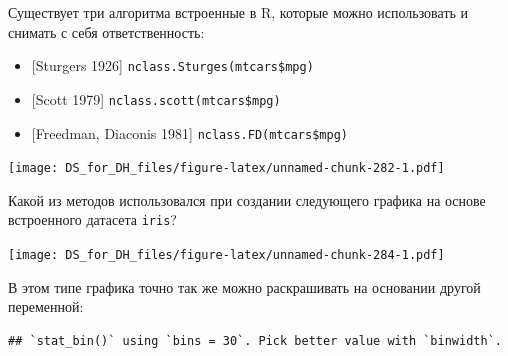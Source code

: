 \documentclass[
]{book}
\makeatletter
\newenvironment{Shaded}{\begin{snugshade}}{\end{snugshade}}
\newcommand{\DataTypeTok}[1]{\textcolor[rgb]{0.13,0.29,0.53}{#1}}
\newcommand{\KeywordTok}[1]{\textcolor[rgb]{0.13,0.29,0.53}{\textbf{#1}}}
\newcommand{\NormalTok}[1]{#1}
\newcommand{\OperatorTok}[1]{\textcolor[rgb]{0.81,0.36,0.00}{\textbf{#1}}}
\newcommand{\StringTok}[1]{\textcolor[rgb]{0.31,0.60,0.02}{#1}}
\providecommand{\tightlist}{%
  \setlength{\itemsep}{0pt}\setlength{\parskip}{0pt}}
\newenvironment{kframe}{%
    \medskip{}
    \setlength{\fboxsep}{.8em}
    \def\at@end@of@kframe{}%
    \ifinner\ifhmode%
    \def\at@end@of@kframe{\end{minipage}}%
    \begin{minipage}{\columnwidth}%
    \fi\fi%
    \def\FrameCommand##1{\hskip\@totalleftmargin \hskip-\fboxsep
    \colorbox{shadecolor}{##1}\hskip-\fboxsep
        \hskip-\linewidth \hskip-\@totalleftmargin \hskip\columnwidth}%
    \MakeFramed {\advance\hsize-\width
      \@totalleftmargin\z@ \linewidth\hsize
      \@setminipage}}%
  {\par\unskip\endMakeFramed%
    \at@end@of@kframe}
\newenvironment{rmdblock}[1]
  {
    \begin{itemize}
    \renewcommand{\labelitemi}{
      \raisebox{-.7\height}[0pt][0pt]{
        {\setkeys{Gin}{width=3em,keepaspectratio}\texttt{[image: images/\#1]}}
        }
        }
        \setlength{\fboxsep}{1em}
        \begin{kframe}
        \item
      }
      {
        \end{kframe}
        \end{itemize}
      }
\newenvironment{rmdtask}
      {\begin{rmdblock}{task}}
      {\end{rmdblock}}
\makeatother
\begin{document}
Существует три алгоритма встроенные в R, которые можно использовать и снимать с себя ответственность:

\begin{itemize}
\tightlist
\item
  {[}Sturgers 1926{]} \texttt{nclass.Sturges(mtcars\$mpg)}
\item
  {[}Scott 1979{]} \texttt{nclass.scott(mtcars\$mpg)}
\item
  {[}Freedman, Diaconis 1981{]} \texttt{nclass.FD(mtcars\$mpg)}
\end{itemize}

\begin{Shaded}
\end{Shaded}

\texttt{[image: DS\_for\_DH\_files/figure-latex/unnamed-chunk-282-1.pdf]}

\begin{rmdtask}
Какой из методов использовался при создании следующего графика на основе
встроенного датасета \texttt{iris}?
\end{rmdtask}

\texttt{[image: DS\_for\_DH\_files/figure-latex/unnamed-chunk-284-1.pdf]}

В этом типе графика точно так же можно раскрашивать на основании другой переменной:

\begin{Shaded}
\end{Shaded}

\begin{verbatim}
## `stat_bin()` using `bins = 30`. Pick better value with `binwidth`.
\end{verbatim}
\end{document}
